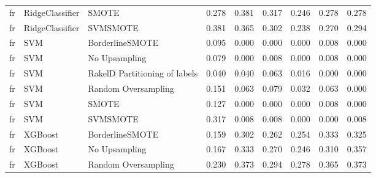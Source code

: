 \begin{tabular}{lllllllll}
      fr &                 RidgeClassifier &                         SMOTE & 0.278 &                     0.381 &                 0.317 &                  0.246 &                                   0.278 &     0.278 \\
      fr &                 RidgeClassifier &                      SVMSMOTE & 0.381 &                     0.365 &                 0.302 &                  0.238 &                                   0.270 &     0.294 \\
      fr &                             SVM &               BorderlineSMOTE & 0.095 &                     0.000 &                 0.000 &                  0.000 &                                   0.008 &     0.000 \\
      fr &                             SVM &                 No Upsampling & 0.079 &                     0.000 &                 0.008 &                  0.000 &                                   0.008 &     0.000 \\
      fr &                             SVM & RakelD Partitioning of labels & 0.040 &                     0.040 &                 0.063 &                  0.016 &                                   0.000 &     0.000 \\
      fr &                             SVM &           Random Oversampling & 0.151 &                     0.063 &                 0.079 &                  0.032 &                                   0.063 &     0.000 \\
      fr &                             SVM &                         SMOTE & 0.127 &                     0.000 &                 0.000 &                  0.000 &                                   0.008 &     0.000 \\
      fr &                             SVM &                      SVMSMOTE & 0.317 &                     0.008 &                 0.008 &                  0.000 &                                   0.000 &     0.008 \\
      fr &                         XGBoost &               BorderlineSMOTE & 0.159 &                     0.302 &                 0.262 &                  0.254 &                                   0.333 &     0.325 \\
      fr &                         XGBoost &                 No Upsampling & 0.167 &                     0.333 &                 0.270 &                  0.246 &                                   0.310 &     0.357 \\
      fr &                         XGBoost &           Random Oversampling & 0.230 &                     0.373 &                 0.294 &                  0.278 &                                   0.365 &     0.373 \\

\end{tabular}
